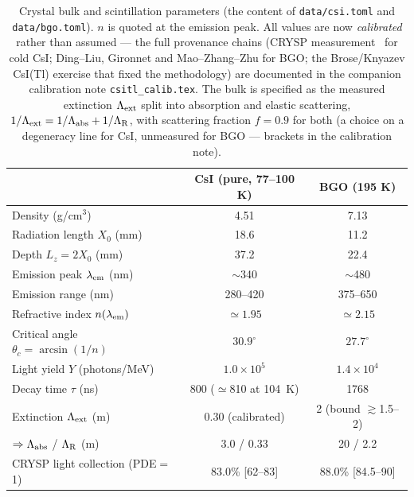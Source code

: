 \documentclass[11pt,a4paper]{article}
\newcommand{\csi}{CsI}
\newcommand{\bgo}{BGO}
\newcommand{\xzero}{X_0}
\begin{document}
\begin{table}[htb]
  \centering
  \caption{Crystal bulk and scintillation parameters (the content of
  \texttt{data/csi.toml} and \texttt{data/bgo.toml}). $n$ is quoted at the emission
  peak. All values are now \emph{calibrated} rather than assumed --- the full provenance
  chains (CRYSP measurement~\cite{soleti2024} for cold \csi{}; Ding--Liu, Gironnet and
  Mao--Zhang--Zhu for \bgo{}; the Brose/Knyazev CsI(Tl) exercise that fixed the
  methodology) are documented in the companion calibration note
  \texttt{csitl\_calib.tex}. The bulk is specified as the measured extinction
  $\Lambda_{\rm ext}$ split into absorption and elastic scattering,
  $1/\Lambda_{\rm ext} = 1/\Lambda_{\rm abs} + 1/\Lambda_{\rm R}$, with scattering
  fraction $f = 0.9$ for both (a choice on a degeneracy line for \csi{}, unmeasured for
  \bgo{} --- brackets in the calibration note).}
  \label{tab:crystals}
  \begin{tabular}{lcc}
    \toprule
     & \csi{} (pure, 77--100 K) & \bgo{} (195 K) \\
    \midrule
    Density (g/cm$^3$)                  & 4.51  & 7.13 \\
    Radiation length $\xzero$ (mm)      & 18.6  & 11.2 \\
    Depth $L_z = 2\xzero$ (mm)          & 37.2  & 22.4 \\
    Emission peak $\lambda_{\rm em}$ (nm) & $\sim$340 & $\sim$480 \\
    Emission range (nm)                 & 280--420 & 375--650 \\
    Refractive index $n(\lambda_{\rm em})$ & $\simeq 1.95$ & $\simeq 2.15$ \\
    Critical angle $\theta_c = \arcsin(1/n)$ & $30.9^\circ$ & $27.7^\circ$ \\
    Light yield $Y$ (photons/MeV)       & $1.0\times10^5$ & $1.4\times10^4$ \\
    Decay time $\tau$ (ns)              & 800 ($\simeq$810 at 104~K) & 1768 \\
    Extinction $\Lambda_{\rm ext}$ (m)  & 0.30 (calibrated) & 2 (bound $\gtrsim$1.5--2) \\
    $\Rightarrow \Lambda_{\rm abs}$ / $\Lambda_{\rm R}$ (m) & 3.0 / 0.33 & 20 / 2.2 \\
    CRYSP light collection (PDE$=$1)    & 83.0\% [62--83] & 88.0\% [84.5--90] \\
    \bottomrule
  \end{tabular}
\end{table}
\end{document}
